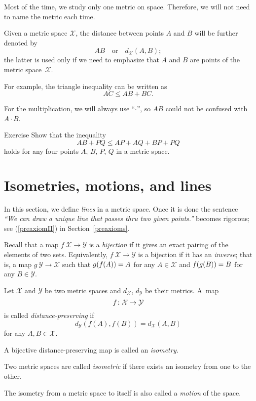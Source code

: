 Most of the time, 
we study only one metric on space.
Therefore, we will not need to name the metric each time.

Given a metric space $\mathcal X$,
the distance between points $A$ and $B$ will be further denoted by 
$$AB
\quad
\text{or}
\quad
d_{\mathcal X}(A,B);$$
the latter is used only if we need to emphasize that $A$ and $B$ are points of the metric space~$\mathcal X$.

For example, the triangle inequality can be written as 
$$AC\le AB+BC.$$

For the multiplication, we will always use ``$\cdot$'',
so $AB$ could not be confused with $A\cdot B$.

\begin{thm}{Exercise}\label{ex:4-triangle}
Show that the inequality
\[AB+PQ\le AP+AQ+BP+PQ\]
holds for any four points $A$, $B$, $P$, $Q$ in a metric space.
\end{thm}


\section{Isometries, motions, and lines}

In this section, we define {}\emph{lines} in a metric space.
Once it is done the sentence {}\emph{``We can draw a unique line that passes thru two given points.''} becomes rigorous; see (\ref{preaxiomII}) in Section~\ref{preaxioms}. 

Recall that a map $f\:\mathcal{X}\to\mathcal{Y}$
is a \emph{bijection}
if it gives an exact pairing of the elements of two sets.
Equivalently, $f\:\mathcal{X}\to\mathcal{Y}$ is a bijection if it has an \emph{inverse};
that is, a map $g\:\mathcal{Y}\to\mathcal{X}$
such that 
$g(f(A))\z=A$ for any $A\in\mathcal{X}$
and
$f(g(B))\z=B$ for any $B\in\mathcal{Y}$. 

Let $\mathcal X$ and $\mathcal Y$ be two metric spaces and $d_{\mathcal X}$, $d_{\mathcal Y}$ be their metrics. 
A~map 
$$f\:\mathcal X \z\to \mathcal Y$$ 
is
called \emph{distance-preserving} if 
$$d_{\mathcal Y}(f(A), f(B))
 = d_{\mathcal X}(A,B)$$
for any $A,B\in {\mathcal X}$.

A bijective distance-preserving map is called an \emph{isometry}. 

Two metric spaces are called
\emph{isometric} if there exists an isometry from one to the other.

The isometry from a metric space to itself 
is also called a \emph{motion} of the space.

